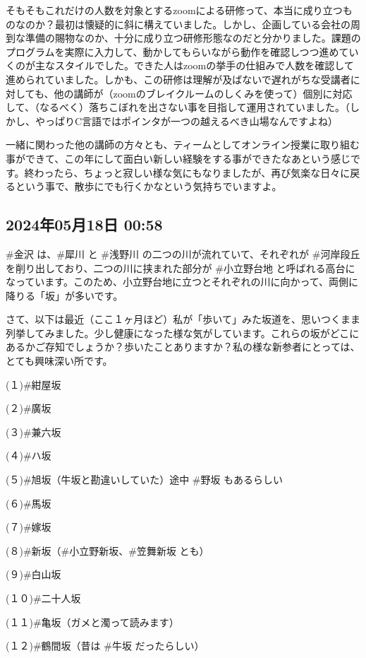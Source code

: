 そもそもこれだけの人数を対象とするzoomによる研修って、本当に成り立つものなのか？最初は懐疑的に斜に構えていました。しかし、企画している会社の周到な準備の賜物なのか、十分に成り立つ研修形態なのだと分かりました。課題のプログラムを実際に入力して、動かしてもらいながら動作を確認しつつ進めていくのが主なスタイルでした。できた人はzoomの挙手の仕組みで人数を確認して進められていました。しかも、この研修は理解が及ばないで遅れがちな受講者に対しても、他の講師が（zoomのブレイクルームのしくみを使って）個別に対応して、（なるべく）落ちこぼれを出さない事を目指して運用されていました。（しかし、やっぱりC言語ではポインタが一つの越えるべき山場なんですよね）

一緒に関わった他の講師の方々とも、ティームとしてオンライン授業に取り組む事ができて、この年にして面白い新しい経験をする事ができたなあという感じです。終わったら、ちょっと寂しい様な気にもなりましたが、再び気楽な日々に戻るという事で、散歩にでも行くかなという気持ちでいますよ。

\subsection*{2024年05月18日 00:58}

\#金沢 は、\#犀川 と \#浅野川 の二つの川が流れていて、それぞれが \#河岸段丘 を削り出しており、二つの川に挟まれた部分が \#小立野台地 と呼ばれる高台になっています。このため、小立野台地に立つとそれぞれの川に向かって、両側に降りる「坂」が多いです。

さて、以下は最近（ここ１ヶ月ほど）私が「歩いて」みた坂道を、思いつくまま列挙してみました。少し健康になった様な気がしています。これらの坂がどこにあるかご存知でしょうか？歩いたことありますか？私の様な新参者にとっては、とても興味深い所です。

(１)\#紺屋坂

(２)\#廣坂

(３)\#兼六坂

(４)\#ハ坂

(５)\#旭坂（牛坂と勘違いしていた）途中 \#野坂 もあるらしい

(６)\#馬坂

(７)\#嫁坂

(８)\#新坂（\#小立野新坂、\#笠舞新坂 とも）

(９)\#白山坂

(１０)\#二十人坂

(１１)\#亀坂（ガメと濁って読みます）

(１２)\#鶴間坂（昔は \#牛坂 だったらしい）

